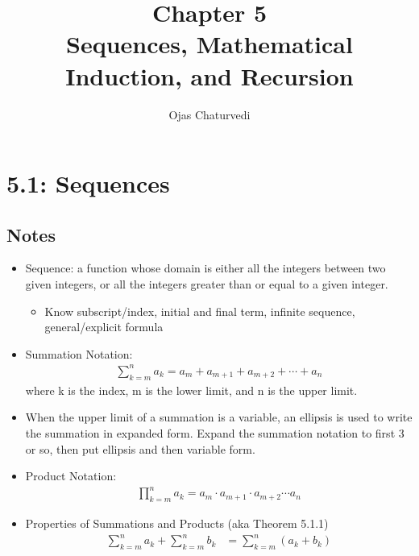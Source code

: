 \documentclass{article}
\title{Chapter 5 \\ \large Sequences, Mathematical Induction, and Recursion}
\author{Ojas Chaturvedi}
\date{}
\begin{document}
\begin{titlingpage}
    \maketitle
    \tableofcontents
\end{titlingpage}

\section{5.1: Sequences}
    \subsection{Notes}
        \begin{itemize}
            \item Sequence: a function whose domain is either all the integers between two given integers, or all the integers greater than or equal to a given integer.
            \begin{itemize}
                \item Know subscript/index, initial and final term, infinite sequence, general/explicit formula
            \end{itemize}
            \item Summation Notation:
                \begin{align*}
                    \sum_{k=m}^{n} a_k = a_m + a_{m+1} + a_{m+2} + \cdots + a_n
                \end{align*}
                where k is the index, m is the lower limit, and n is the upper limit.
            \item When the upper limit of a summation is a variable, an ellipsis is used to write the summation in expanded form. Expand the summation notation to first 3 or so, then put ellipsis and then variable form.
            \item Product Notation:
                \begin{align*}
                    \prod_{k=m}^{n} a_k = a_m \cdot a_{m+1} \cdot a_{m+2} \cdots a_n
                \end{align*}
            \item Properties of Summations and Products (aka Theorem 5.1.1)
                \begin{align}
                    \sum_{k=m}^{n} a_k + \sum_{k=m}^{n} b_k &= \sum_{k=m}^{n} (a_k + b_k) \\

\end{align}
\end{itemize}
\end{document}
